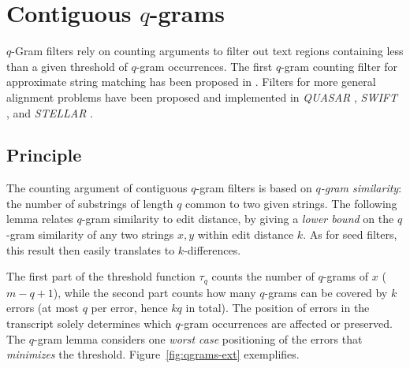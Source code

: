 




\section{Contiguous $q$-grams}
\label{sec:filtering:qgrams-ext}

$q$-Gram filters rely on counting arguments to filter out text regions containing less than a given threshold of $q$-gram occurrences.
The first $q$-gram counting filter for approximate string matching has been proposed in \citep{Jokinen1991}.
Filters for more general alignment problems have been proposed and implemented in \emph{QUASAR} \citep{Burkhardt1999}, \emph{SWIFT} \citep{Rasmussen2006}, and \emph{STELLAR} \citep{Kehr2011}.

\subsection{Principle}

The counting argument of contiguous $q$-gram filters is based on \emph{$q$-gram similarity}: the number of substrings of length $q$ common to two given strings.
The following lemma relates $q$-gram similarity to edit distance, by giving a \emph{lower bound} on the $q$-gram similarity of any two strings $x,y$ within edit distance $k$.
As for seed filters, this result then easily translates to $k$-differences.

The first part of the threshold function $\tau_q$ counts the number of $q$-grams of $x$ (\ie $m - q + 1$), while the second part counts how many $q$-grams can be covered by $k$ errors (\ie at most $q$ per error, hence $kq$ in total).
The position of errors in the transcript solely determines which $q$-gram occurrences are affected or preserved.
The $q$-gram lemma considers one \emph{worst case} positioning of the errors that \emph{minimizes} the threshold.
Figure~\ref{fig:qgrams-ext} exemplifies.

